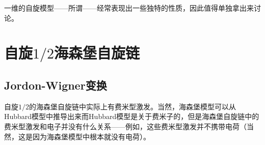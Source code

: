 一维的自旋模型——所谓——经常表现出一些独特的性质，因此值得单独拿出来讨论。

\section{自旋$1/2$海森堡自旋链}

\subsection{Jordon-Wigner变换}

自旋$1/2$的海森堡自旋链中实际上有费米型激发。当然，海森堡模型可以从Hubbard模型中推导出来而Hubbard模型是关于费米子的，但是海森堡自旋链中的费米型激发和电子并没有什么关系——例如，这些费米型激发并不携带电荷（当然，这是因为海森堡模型中根本就没有电荷）。

